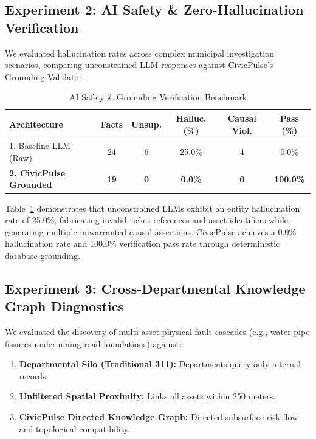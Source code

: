 \documentclass[conference]{IEEEtran}
\begin{document}
\subsection{Experiment 2: AI Safety \& Zero-Hallucination Verification}
We evaluated hallucination rates across complex municipal investigation scenarios, comparing unconstrained LLM responses against CivicPulse's Grounding Validator.

\begin{table}[htbp]
\caption{AI Safety \& Grounding Verification Benchmark}
\label{tab:grounding}
\centering
\begin{tabular}{lccccc}
\toprule
\textbf{Architecture} & \textbf{Facts} & \textbf{Unsup.} & \textbf{Halluc. (\%)} & \textbf{Causal Viol.} & \textbf{Pass (\%)} \\
\midrule
1. Baseline LLM (Raw) & 24 & 6 & 25.0\% & 4 & 0.0\% \\
\textbf{2. CivicPulse Grounded} & \textbf{19} & \textbf{0} & \textbf{0.0\%} & \textbf{0} & \textbf{100.0\%} \\
\bottomrule
\end{tabular}
\end{table}

Table~\ref{tab:grounding} demonstrates that unconstrained LLMs exhibit an entity hallucination rate of 25.0\%, fabricating invalid ticket references and asset identifiers while generating multiple unwarranted causal assertions. CivicPulse achieves a 0.0\% hallucination rate and 100.0\% verification pass rate through deterministic database grounding.

\subsection{Experiment 3: Cross-Departmental Knowledge Graph Diagnostics}
We evaluated the discovery of multi-asset physical fault cascades (e.g., water pipe fissures undermining road foundations) against:
\begin{enumerate}
    \item \textbf{Departmental Silo (Traditional 311):} Departments query only internal records.
    \item \textbf{Unfiltered Spatial Proximity:} Links all assets within 250 meters.
    \item \textbf{CivicPulse Directed Knowledge Graph:} Directed subsurface risk flow and topological compatibility.
\end{enumerate}
\end{document}

